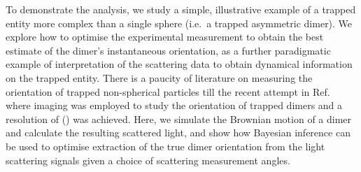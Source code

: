 \documentclass[final, 3p]{elsarticle}
\begin{document}
To demonstrate the analysis, we study a simple, illustrative example
of a trapped entity more complex than a single sphere (i.e.\ a trapped
asymmetric dimer).  We explore how to optimise the experimental
measurement to obtain the best estimate of the dimer's instantaneous
orientation, as a further paradigmatic example of interpretation of
the scattering data to obtain dynamical information on the trapped
entity.  There is a paucity of literature on measuring the orientation
of trapped non-spherical particles till the recent attempt in
Ref.~ where imaging was employed to
study the orientation of trapped dimers and a resolution of () was
achieved.  Here, we simulate the Brownian motion of a dimer and
calculate the resulting scattered light, and show how Bayesian
inference can be used to optimise extraction of the true dimer
orientation from the light scattering signals given a choice of
scattering measurement angles.
\end{document}
